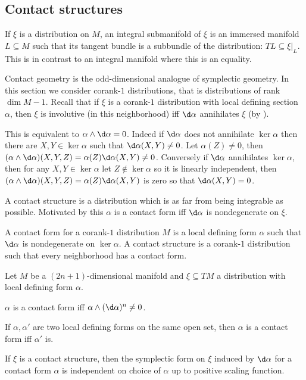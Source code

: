\subsection{Contact structures}

\bdefn

    If $\xi$ is a distribution on $M$, an {\emphcolor integral submanifold} of $\xi$ is an immersed manifold
    $L\subseteq M$ such that its tangent bundle is a subbundle of the distribution: $TL\subseteq\xi|_L$.
    This is in contrast to an integral manifold where this is an equality.

\edefn

Contact geometry is the odd-dimensional analogue of symplectic geometry.
In this section we consider corank-$1$ distributions, that is distributions of rank $\dim M-1$.
Recall that if $\xi$ is a corank-$1$ distribution with local defining section $\alpha$, then $\xi$
is involutive (in this neighborhood) iff $\d\alpha$ annihilates $\xi$ (by ).

This is equivalent to $\alpha\wedge\d\alpha=0$.
Indeed if $\d\alpha$ does not annihilate $\ker\alpha$ then there are $X,Y\in\ker\alpha$ such that
$\d\alpha(X,Y)\neq0$.
Let $\alpha(Z)\neq0$, then $(\alpha\wedge\d\alpha)(X,Y,Z)=\alpha(Z)\d\alpha(X,Y)\neq0$.
Conversely if $\d\alpha$ annihilates $\ker\alpha$, then for any $X,Y\in\ker\alpha$ let $Z\notin\ker\alpha$
so it is linearly independent, then $(\alpha\wedge\d\alpha)(X,Y,Z)=\alpha(Z)\d\alpha(X,Y)$ is zero so that
$\d\alpha(X,Y)=0$.

A contact structure is a distribution which is as far from being integrable as possible.
Motivated by this $\alpha$ is a contact form iff $\d\alpha$ is nondegenerate on $\xi$.

\bdefn

    A {\emphcolor contact form} for a corank-$1$ distribution $M$ is a local defining form $\alpha$
    such that $\d\alpha$ is nondegenerate on $\ker\alpha$.
    A {\emphcolor contact structure} is a corank-$1$ distribution such that every neighborhood has a
    contact form.

\edefn

\bprop

    Let $M$ be a $(2n+1)$-dimensional manifold and $\xi\subseteq TM$ a distribution with local defining form
    $\alpha$.
    \benum
        \item $\alpha$ is a contact form iff $\alpha\wedge(\d\alpha)^n\neq0$.
        \item If $\alpha,\alpha'$ are two local defining forms on the same open set, then $\alpha$
        is a contact form iff $\alpha'$ is.
        \item If $\xi$ is a contact structure, then the symplectic form on $\xi$ induced by $\d\alpha$
        for a contact form $\alpha$ is independent on choice of $\alpha$ up to positive scaling function.
    \eenum

